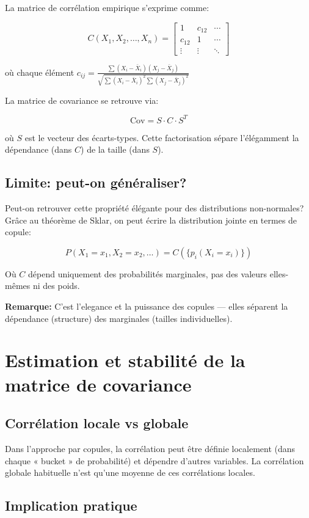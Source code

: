 \documentclass[11pt,a4paper]{article}
\begin{document}
La matrice de corrélation empirique s'exprime comme:

\[
C(X_1, X_2, \ldots, X_n) = \begin{bmatrix} 
1 & c_{12} & \cdots \\
c_{12} & 1 & \cdots \\
\vdots & \vdots & \ddots
\end{bmatrix}
\]

où chaque élément $c_{ij} = \frac{\sum (X_i - \bar{X}_i)(X_j - \bar{X}_j)}{\sqrt{\sum (X_i - \bar{X}_i)^2 \sum (X_j - \bar{X}_j)^2}}$

La matrice de covariance se retrouve via:

\[
\text{Cov} = S \cdot C \cdot S^T
\]

où $S$ est le vecteur des écarts-types. Cette factorisation sépare l'élégamment la dépendance (dans $C$) de la taille (dans $S$).

\subsection{Limite: peut-on généraliser?}

Peut-on retrouver cette propriété élégante pour des distributions non-normales? Grâce au théorème de Sklar, on peut écrire la distribution jointe en termes de copule:

\[
P(X_1 = x_1, X_2 = x_2, \ldots) = C(\{p_i(X_i = x_i)\})
\]

Où $C$ dépend uniquement des probabilités marginales, pas des valeurs elles-mêmes ni des poids.

\textbf{Remarque:} C'est l'elegance et la puissance des copules — elles séparent la dépendance (structure) des marginales (tailles individuelles).

\section{Estimation et stabilité de la matrice de covariance}

\subsection{Corrélation locale vs globale}

Dans l'approche par copules, la corrélation peut être définie localement (dans chaque « bucket » de probabilité) et dépendre d'autres variables. La corrélation globale habituelle n'est qu'une moyenne de ces corrélations locales.

\subsection{Implication pratique}
\end{document}
